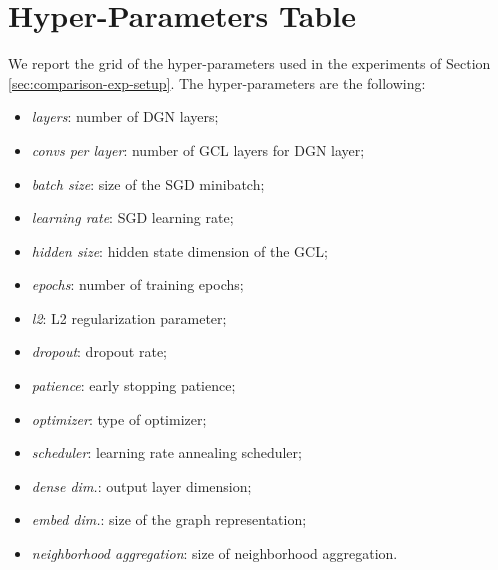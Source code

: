 
\chapter{Hyper-Parameters Table} %

\label{AppendixA} %
We report the grid of the hyper-parameters used in the experiments of Section \ref{sec:comparison-exp-setup}.
The hyper-parameters are the following:
\begin{itemize}
    \item \emph{layers}: number of DGN layers;
    \item \emph{convs per layer}: number of GCL layers for DGN layer;
    \item \emph{batch size}: size of the SGD minibatch;
    \item \emph{learning rate}: SGD learning rate;
    \item \emph{hidden size}: hidden state dimension of the GCL;
    \item \emph{epochs}: number of training epochs;
    \item \emph{l2}: L2 regularization parameter;
    \item \emph{dropout}: dropout rate;
    \item \emph{patience}: early stopping patience;
    \item \emph{optimizer}: type of optimizer;
    \item \emph{scheduler}: learning rate annealing scheduler;
    \item \emph{dense dim.}: output layer dimension;
    \item \emph{embed dim.}: size of the graph representation;
    \item \emph{neighborhood aggregation}: size of neighborhood aggregation.
\end{itemize}
